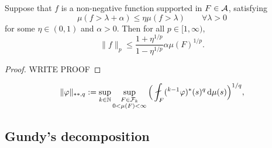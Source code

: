 \begin{lem}
  Suppose that $f$ is a non-negative function supported in $F \in \mathcal{A}$, satisfying
  \begin{equation*}
    \mu(f > \lambda + \alpha) \leq \eta \mu(f > \lambda) \qquad \forall \lambda > 0
  \end{equation*}
  for some $\eta \in (0,1)$ and $\alpha > 0$.
  Then for all $p \in [1,\infty)$,
  \begin{equation*}
    \|f\|_p \leq \frac{1 + \eta^{1/p}}{1 - \eta^{1/p}} \alpha \mu(F)^{1/p}.
  \end{equation*}
\end{lem}

\begin{proof}
  {\color{red} WRITE PROOF}
\end{proof}


{\color{blue}

\begin{equation*}
  \|\phi\|_{**,q} := \sup_{k \in \N} \sup_{\substack{F \in \mc{F}_k \\ 0 < \mu(F) < \infty}} \Big( \fint_{F} ({}^{k-1} \phi)^{*}(s)^q \, \dd\mu(s) \Big)^{1/q},
\end{equation*}

}






\subsection{Gundy's decomposition}


